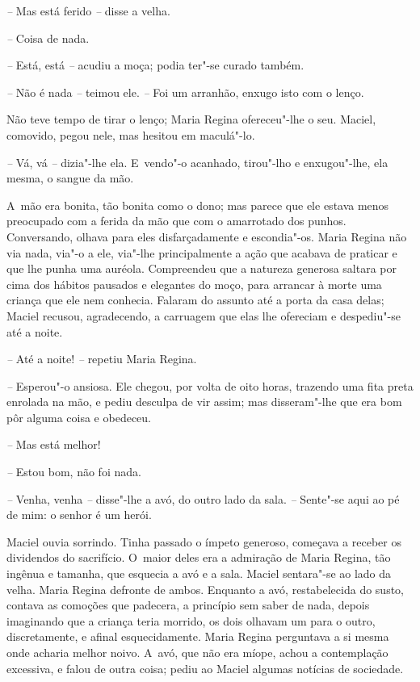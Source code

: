 \emph{--} Mas está ferido \emph{--} disse a velha.

\emph{--} Coisa de nada.

\emph{--} Está, está \emph{--} acudiu a moça; podia ter"-se curado
também.

\emph{--} Não é nada \emph{--} teimou ele. \emph{--} Foi um arranhão,
enxugo isto com o lenço.

Não teve tempo de tirar o lenço; Maria Regina ofereceu"-lhe o seu.
Maciel, comovido, pegou nele, mas hesitou em maculá"-lo.

\emph{--} Vá, vá \emph{--} dizia"-lhe ela. E~vendo"-o acanhado, tirou"-lho
e enxugou"-lhe, ela mesma, o sangue da mão.

A~mão era bonita, tão bonita como o dono; mas parece que ele estava
menos preocupado com a ferida da mão que com o amarrotado dos punhos.
Conversando, olhava para eles disfarçadamente e escondia"-os. Maria
Regina não via nada, via"-o a ele, via"-lhe principalmente a ação que
acabava de praticar e que lhe punha uma auréola. Compreendeu que a
natureza generosa saltara por cima dos hábitos pausados e elegantes do
moço, para arrancar à morte uma criança que ele nem conhecia. Falaram do
assunto até a porta da casa delas; Maciel recusou, agradecendo, a
carruagem que elas lhe ofereciam e despediu"-se até a noite.

\emph{--} Até a noite! \emph{--} repetiu Maria Regina.

\emph{--} Esperou"-o ansiosa. Ele chegou, por volta de oito horas,
trazendo uma fita preta enrolada na mão, e pediu desculpa de vir assim;
mas disseram"-lhe que era bom pôr alguma coisa e obedeceu.

\emph{--} Mas está melhor!

\emph{--} Estou bom, não foi nada.

\emph{--} Venha, venha \emph{--} disse"-lhe a avó, do outro lado da sala.
\emph{--} Sente"-se aqui ao pé de mim: o senhor é um herói.

Maciel ouvia sorrindo. Tinha passado o ímpeto generoso, começava a
receber os dividendos do sacrifício. O~maior deles era a admiração de
Maria Regina, tão ingênua e tamanha, que esquecia a avó e a sala. Maciel
sentara"-se ao lado da velha. Maria Regina defronte de ambos. Enquanto a
avó, restabelecida do susto, contava as comoções que padecera, a
princípio sem saber de nada, depois imaginando que a criança teria
morrido, os dois olhavam um para o outro, discretamente, e afinal
esquecidamente. Maria Regina perguntava a si mesma onde acharia melhor
noivo. A~avó, que não era míope, achou a contemplação excessiva, e falou
de outra coisa; pediu ao Maciel algumas notícias de sociedade.

